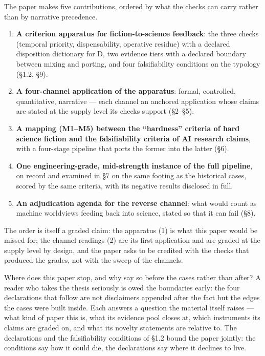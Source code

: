 \documentclass[11pt,a4paper]{article}
\begin{document}
The paper makes five contributions, ordered by what the checks can carry rather than by narrative precedence.

\begin{enumerate}[leftmargin=1.6em,itemsep=2pt,parsep=0pt,topsep=3pt]
\item \textbf{A criterion apparatus for fiction-to-science feedback}: the three checks (temporal priority, dispensability, operative residue) with a declared disposition dictionary for D, two evidence tiers with a declared boundary between mixing and porting, and four falsifiability conditions on the typology (§1.2, §9).
\item \textbf{A four-channel application of the apparatus}: formal, controlled, quantitative, narrative — each channel an anchored application whose claims are stated at the supply level its checks support (§2–§5).
\item \textbf{A mapping (M1–M5) between the ``hardness'' criteria of hard science fiction and the falsifiability criteria of AI research claims}, with a four-stage pipeline that ports the former into the latter (§6).
\item \textbf{One engineering-grade, mid-strength instance of the full pipeline}, on record and examined in §7 on the same footing as the historical cases, scored by the same criteria, with its negative results disclosed in full.
\item \textbf{An adjudication agenda for the reverse channel}: what would count as machine worldviews feeding back into science, stated so that it can fail (§8).
\end{enumerate}

The order is itself a graded claim: the apparatus (1) is what this paper would be missed for; the channel readings (2) are its first application and are graded at the supply level by design, and the paper asks to be credited with the checks that produced the grades, not with the sweep of the channels.

Where does this paper stop, and why say so before the cases rather than after? A reader who takes the thesis seriously is owed the boundaries early: the four declarations that follow are not disclaimers appended after the fact but the edges the cases were built inside. Each answers a question the material itself raises --- what kind of paper this is, what its evidence pool closes at, which instruments its claims are graded on, and what its novelty statements are relative to. The declarations and the falsifiability conditions of \S1.2 bound the paper jointly: the conditions say how it could die, the declarations say where it declines to live.
\end{document}
